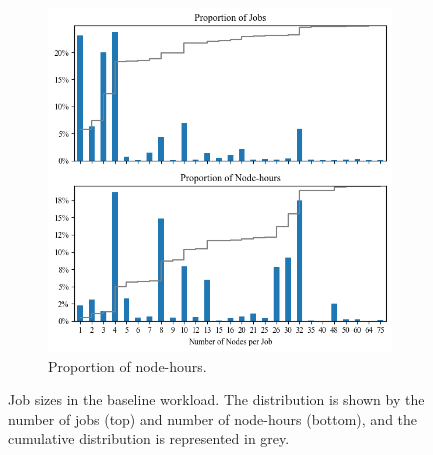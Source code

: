 \documentclass[a4paper,fleqn]{cas-dc}
\begin{document}
\begin{figure}[tbp]
\begin{subfigure}[t]{0.8\linewidth}
    \centering
    \includegraphics[clip,width=\linewidth,trim={0.1cm 0.1cm 0.1cm 7.75cm}]{figures/job_proportions.png}
    \caption{Proportion of node-hours.}
    \label{fig:wl_distrib_runtime_size_bottom}
\end{subfigure}

\caption{Job sizes in the baseline workload. The distribution is shown by the number of jobs (top) and number of node-hours (bottom), and the cumulative distribution is represented in grey.}
\label{fig:wl_distrib_runtime_size}
\end{figure}
\end{document}
